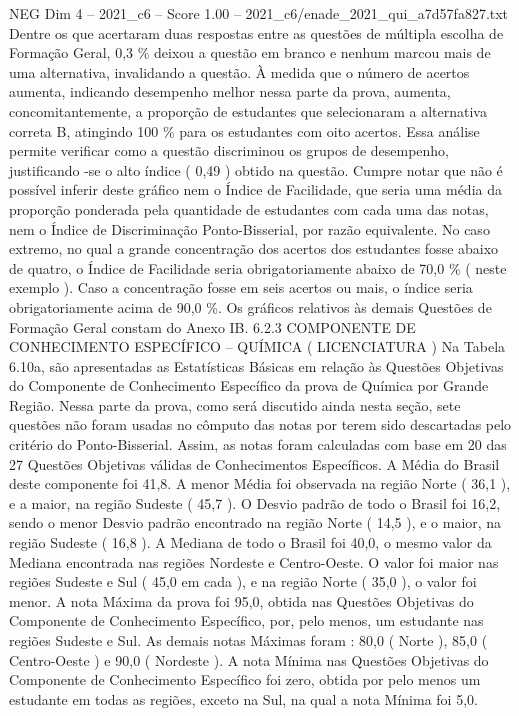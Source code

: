 \begin{textsample}{NEG Dim 4 – 2021\_c6 – Score 1.00 – 2021\_c6/enade\_2021\_qui\_a7d57fa827.txt}
Dentre os que acertaram duas respostas entre as questões de múltipla escolha de Formação Geral, 0,3 \% deixou a questão em branco e nenhum marcou mais de uma alternativa, invalidando a questão.
À medida que o número de acertos aumenta, indicando desempenho melhor nessa parte da prova, aumenta, concomitantemente, a proporção de estudantes que selecionaram a alternativa correta B, atingindo 100 \% para os estudantes com oito acertos.
Essa análise permite verificar como a questão discriminou os grupos de desempenho, justificando -se o alto índice ( 0,49 ) obtido na questão.
Cumpre notar que não é possível inferir deste gráfico nem o Índice de Facilidade, que seria uma média da proporção ponderada pela quantidade de estudantes com cada uma das notas, nem o Índice de Discriminação Ponto-Bisserial, por razão equivalente.
No caso extremo, no qual a grande concentração dos acertos dos estudantes fosse abaixo de quatro, o Índice de Facilidade seria obrigatoriamente abaixo de 70,0 \% ( neste exemplo ).
Caso a concentração fosse em seis acertos ou mais, o índice seria obrigatoriamente acima de 90,0 \%.
Os gráficos relativos às demais Questões de Formação Geral constam do Anexo IB. 6.2.3 COMPONENTE DE CONHECIMENTO ESPECÍFICO – QUÍMICA ( LICENCIATURA ) Na Tabela 6.10a, são apresentadas as Estatísticas Básicas em relação às Questões Objetivas do Componente de Conhecimento Específico da prova de Química por Grande Região.
Nessa parte da prova, como será discutido ainda nesta seção, sete questões não foram usadas no cômputo das notas por terem sido descartadas pelo critério do Ponto-Bisserial.
Assim, as notas foram calculadas com base em 20 das 27 Questões Objetivas válidas de Conhecimentos Específicos.
A Média do Brasil deste componente foi 41,8.
A menor Média foi observada na região Norte ( 36,1 ), e a maior, na região Sudeste ( 45,7 ).
O Desvio padrão de todo o Brasil foi 16,2, sendo o menor Desvio padrão encontrado na região Norte ( 14,5 ), e o maior, na região Sudeste ( 16,8 ).
A Mediana de todo o Brasil foi 40,0, o mesmo valor da Mediana encontrada nas regiões Nordeste e Centro-Oeste.
O valor foi maior nas regiões Sudeste e Sul ( 45,0 em cada ), e na região Norte ( 35,0 ), o valor foi menor.
A nota Máxima da prova foi 95,0, obtida nas Questões Objetivas do Componente de Conhecimento Específico, por, pelo menos, um estudante nas regiões Sudeste e Sul.
As demais notas Máximas foram : 80,0 ( Norte ), 85,0 ( Centro-Oeste ) e 90,0 ( Nordeste ).
A nota Mínima nas Questões Objetivas do Componente de Conhecimento Específico foi zero, obtida por pelo menos um estudante em todas as regiões, exceto na Sul, na qual a nota Mínima foi 5,0.

\end{textsample}
